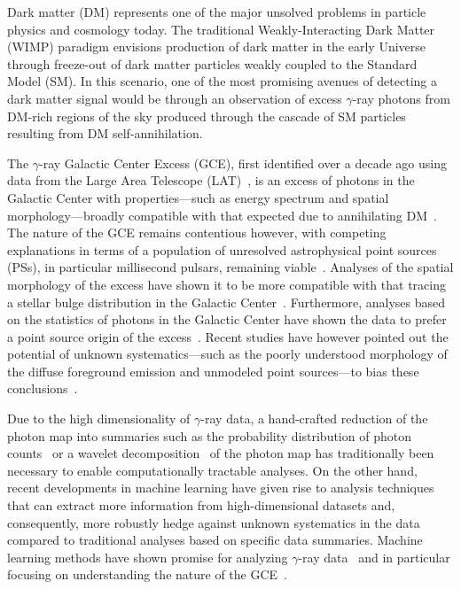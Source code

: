 \documentclass[prd,aps,10pt,nofootinbib,twocolumn,superscriptaddress,preprintnumbers,balancelastpage,longbibliography]{revtex4-1}
\begin{document}
Dark matter (DM) represents one of the major unsolved problems in particle physics and cosmology today. The traditional Weakly-Interacting Dark Matter (WIMP) paradigm envisions production of dark matter in the early Universe through freeze-out of dark matter particles weakly coupled to the Standard Model (SM). In this scenario, one of the most promising avenues of detecting a dark matter signal would be through an observation of excess $\gamma$-ray photons from DM-rich regions of the sky produced through the cascade of SM particles resulting from DM self-annihilation. 

The \Fermi $\gamma$-ray Galactic Center Excess (GCE), first identified over a decade ago using data from the \Fermi Large Area Telescope (LAT)~\cite{Atwood:2009ez}, is an excess of photons in the Galactic Center with properties---such as energy spectrum and spatial morphology---broadly compatible with that expected due to annihilating DM~\cite{Goodenough:2009gk,Hooper:2010mq,Boyarsky:2010dr,Hooper:2011ti,Abazajian:2012pn,Hooper:2013rwa,Gordon:2013vta,Abazajian:2014fta,Daylan:2014rsa,Calore:2014xka,Abazajian:2014hsa,TheFermi-LAT:2015kwa,Linden:2016rcf,Macias:2016nev,Clark:2016mbb}. The nature of the GCE remains contentious however, with competing explanations in terms of a population of unresolved astrophysical point sources (PSs), in particular millisecond pulsars, remaining viable~\cite{Abazajian:2014fta,Abazajian:2010zy,Hooper:2013nhl,Calore:2014oga,Cholis:2014lta,Petrovic:2014xra,Yuan:2014yda,Brandt:2015ula}. Analyses of the spatial morphology of the excess have shown it to be more compatible with that tracing a stellar bulge distribution in the Galactic Center~\cite{Macias:2016nev,Macias:2019omb,Bartels:2017vsx}. Furthermore, analyses based on the statistics of photons in the Galactic Center have shown the data to prefer a point source origin of the excess~\cite{Lee:2015fea,Bartels:2015aea}. Recent studies have however pointed out the potential of unknown systematics---such as the poorly understood morphology of the diffuse foreground emission and unmodeled point sources---to bias these conclusions~\cite{Leane:2020nmi,Leane:2020pfc,Leane:2019xiy}.

 Due to the high dimensionality of $\gamma$-ray data, a hand-crafted reduction of the photon map into summaries such as the probability distribution of photon counts~\cite{Lee:2014mza,Lee:2015fea} or a wavelet decomposition~\cite{Balaji:2018rwz,McDermott:2015ydv} of the photon map has traditionally been necessary to enable computationally tractable analyses. On the other hand, recent developments in machine learning have given rise to analysis techniques that can extract more information from high-dimensional datasets and, consequently, more robustly hedge against unknown systematics in the data compared to traditional analyses based on specific data summaries. Machine learning methods have shown promise for analyzing $\gamma$-ray data~\cite{Caron:2021map} and in particular focusing on understanding the nature of the GCE~\cite{List:2020mzd,Caron:2017udl}. 
 
\end{document}
